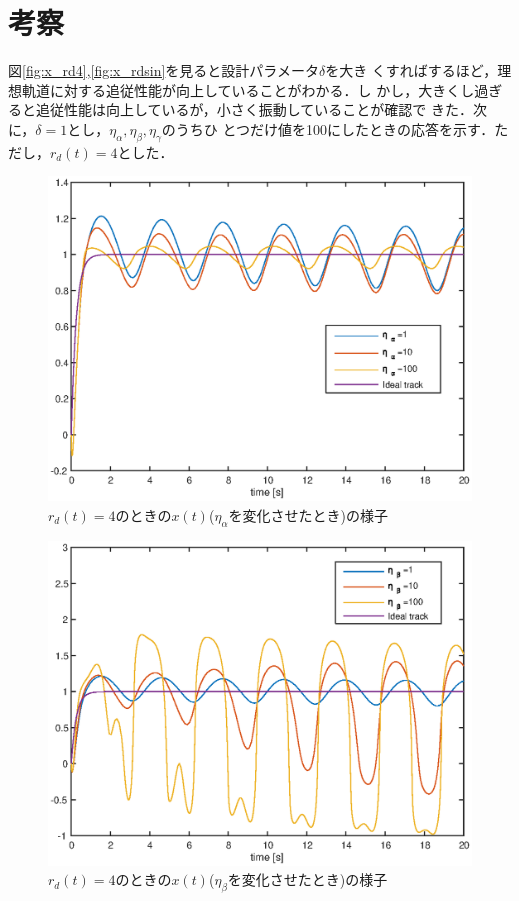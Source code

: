 \documentclass[a4paper,12pt]{jarticle}
\begin{document}
\section{考察}
図\ref{fig:x_rd4},\ref{fig:x_rdsin}を見ると設計パラメータ$\delta$を大き
くすればするほど，理想軌道に対する追従性能が向上していることがわかる．し
かし，大きくし過ぎると追従性能は向上しているが，小さく振動していることが確認で
きた．次に，$\delta=1$とし，$\eta_\alpha,\eta_\beta,\eta_\gamma$のうちひ
とつだけ値を100にしたときの応答を示す．ただし，$r_d(t)=4$とした．
%
\begin{figure}[htb]
    \begin{center}
       \includegraphics[width=140mm]{fig/x_rd4_Etaa.eps}
        \caption{$r_d(t)=4$のときの$x(t)$($\eta_\alpha$を変化させたとき)の様子}
        \label{fig:x_rd4etaa}
    \end{center}
\end{figure}
%
%
\begin{figure}[htb]
    \begin{center}
       \includegraphics[width=140mm]{fig/x_rd4_Etab.eps}
        \caption{$r_d(t)=4$のときの$x(t)$($\eta_\beta$を変化させたとき)の様子}
        \label{fig:x_rd4etaa}
    \end{center}
\end{figure}
\end{document}
